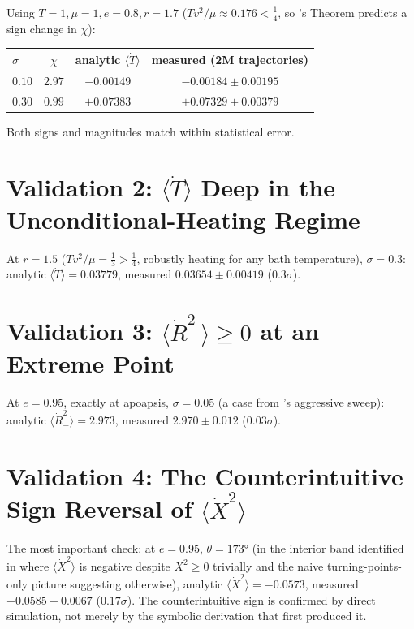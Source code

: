 \documentclass[12pt]{amsart}
\theoremstyle{plain}
\theoremstyle{remark}
\begin{document}
Using $T=1,\mu=1,e=0.8,r=1.7$ ($Tv^2/\mu\approx0.176<\tfrac14$, so \cite{Ebert2026Cancellation}'s Theorem predicts a sign change in $\chi$):
\begin{center}
\begin{tabular}{lccc}
\hline
$\sigma$ & $\chi$ & analytic $\langle\dot T\rangle$ & measured (2M trajectories) \\
\hline
$0.10$ & $2.97$ & $-0.00149$ & $-0.00184\pm0.00195$ \\
$0.30$ & $0.99$ & $+0.07383$ & $+0.07329\pm0.00379$ \\
\hline
\end{tabular}
\end{center}
Both signs and magnitudes match within statistical error.

\section{Validation 2: $\langle\dot T\rangle$ Deep in the Unconditional-Heating Regime}

At $r=1.5$ ($Tv^2/\mu=\tfrac13>\tfrac14$, robustly heating for any bath temperature), $\sigma=0.3$: analytic $\langle\dot T\rangle=0.03779$, measured $0.03654\pm0.00419$ ($0.3\sigma$).

\section{Validation 3: $\langle\dot R_-^2\rangle\geq0$ at an Extreme Point}

At $e=0.95$, exactly at apoapsis, $\sigma=0.05$ (a case from \cite{Ebert2026Rest}'s aggressive sweep): analytic $\langle\dot R_-^2\rangle=2.973$, measured $2.970\pm0.012$ ($0.03\sigma$).

\section{Validation 4: The Counterintuitive Sign Reversal of $\langle\dot X^2\rangle$}

The most important check: at $e=0.95$, $\theta=173°$ (in the interior band identified in \cite{Ebert2026Rest} where $\langle\dot X^2\rangle$ is negative despite $X^2\geq0$ trivially and the naive turning-points-only picture suggesting otherwise), analytic $\langle\dot X^2\rangle=-0.0573$, measured $-0.0585\pm0.0067$ ($0.17\sigma$). The counterintuitive sign is confirmed by direct simulation, not merely by the symbolic derivation that first produced it.
\end{document}
